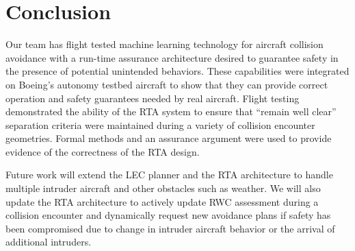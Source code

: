 \section{Conclusion}

%
%


Our team has flight tested machine learning technology for aircraft collision avoidance with a
run-time assurance architecture desired to guarantee safety in the presence of potential
unintended behaviors.  These capabilities were integrated on Boeing’s
autonomy testbed aircraft to show that they can provide correct operation and
safety guarantees needed by real aircraft.  Flight testing demonstrated the ability of the RTA
system to ensure that ``remain well clear'' separation criteria were maintained during a variety of 
collision encounter geometries.  Formal methods and an assurance argument were used to 
provide evidence of the correctness of the RTA design. 

Future work will extend the LEC planner and the RTA architecture to handle multiple intruder 
aircraft and other obstacles such as weather.  We will also update the RTA architecture to 
actively update RWC assessment during a collision encounter and dynamically request
new avoidance plans if safety has been compromised due to change in intruder aircraft behavior 
or the arrival of additional intruders.  
